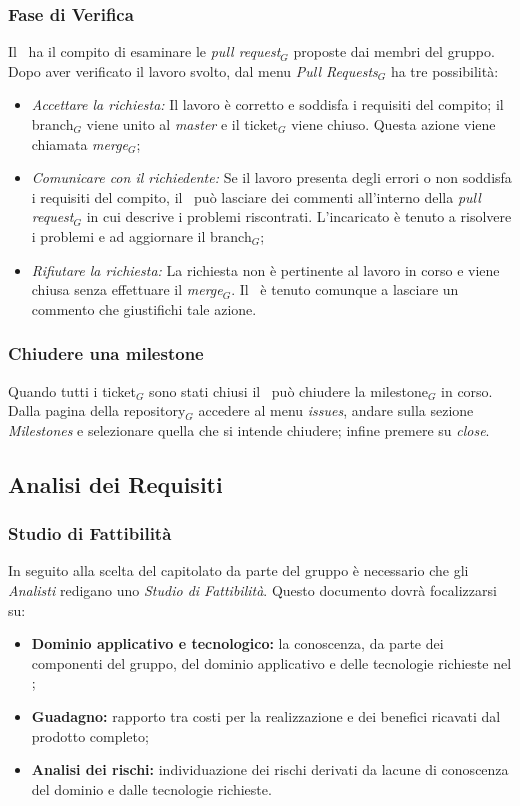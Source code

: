 \subsubsection{Fase di Verifica}
Il \ruoloVerificatore\ ha il compito di esaminare le \textit{pull request}$_G$ proposte dai membri del gruppo.\\
Dopo aver verificato il lavoro svolto, dal menu \textit{Pull Requests}$_G$ ha tre possibilità:
\begin{itemize}
\item \textit{Accettare la richiesta:} Il lavoro è corretto e soddisfa i requisiti del compito; il branch$_G$ viene unito al \textit{master} e il ticket$_G$ viene chiuso. Questa azione viene chiamata \textit{merge}$_G$;
\item \textit{Comunicare con il richiedente:} Se il lavoro presenta degli errori o non soddisfa i requisiti del compito, il \ruoloVerificatore\ può lasciare dei commenti all'interno della \textit{pull request}$_G$ in cui descrive i problemi riscontrati. L'incaricato è tenuto a risolvere i problemi e ad aggiornare il branch$_G$;
\item \textit{Rifiutare la richiesta:} La richiesta non è pertinente al lavoro in corso e viene chiusa senza effettuare il \textit{merge}$_G$. Il \ruoloVerificatore\ è tenuto comunque a lasciare un commento che giustifichi tale azione.
\end{itemize}

\subsubsection{Chiudere una milestone}
Quando tutti i ticket$_G$ sono stati chiusi il \ruoloResponsabile\ può chiudere la milestone$_G$ in corso. \\
Dalla pagina della repository$_G$ accedere al menu \textit{issues}, andare sulla sezione \textit{Milestones} e selezionare quella che si intende chiudere; infine premere su \textit{close}.




\subsection{Analisi dei Requisiti}
\subsubsection{Studio di Fattibilità}
In seguito alla scelta del capitolato da parte del gruppo è necessario che gli \textit{Analisti} redigano uno \textit{Studio di Fattibilità}. Questo documento dovrà focalizzarsi su:
\begin{itemize}
\item \textbf{Dominio applicativo e tecnologico:} la conoscenza, da parte dei componenti del gruppo, del dominio applicativo e delle tecnologie richieste nel  ; 
\item \textbf{Guadagno:} rapporto tra costi per la realizzazione e dei benefici ricavati dal prodotto completo;
\item \textbf{Analisi dei rischi:} individuazione dei rischi derivati da lacune di conoscenza del dominio e dalle tecnologie richieste.  
\end{itemize}
